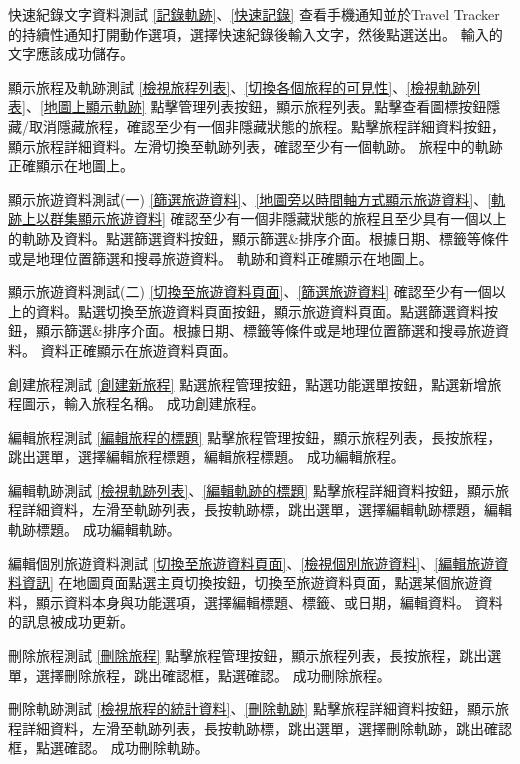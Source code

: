 \addtestcase
  {快速紀錄文字資料測試}
  {}
  {\ref{記錄軌跡}、\ref{快速記錄}}
  {查看手機通知並於Travel Tracker的持續性通知打開動作選項，選擇快速紀錄後輸入文字，然後點選送出。}
  {輸入的文字應該成功儲存。}

\addtestcase
  {顯示旅程及軌跡測試}
  {}
  {\ref{檢視旅程列表}、\ref{切換各個旅程的可見性}、\ref{檢視軌跡列表}、\ref{地圖上顯示軌跡}}
  {點擊管理列表按鈕，顯示旅程列表。點擊查看圖標按鈕隱藏/取消隱藏旅程，確認至少有一個非隱藏狀態的旅程。點擊旅程詳細資料按鈕，顯示旅程詳細資料。左滑切換至軌跡列表，確認至少有一個軌跡。}
  {旅程中的軌跡正確顯示在地圖上。}

\addtestcase
  {顯示旅遊資料測試(一)}
  {}
  {\ref{篩選旅遊資料}、\ref{地圖旁以時間軸方式顯示旅遊資料}、\ref{軌跡上以群集顯示旅遊資料}}
  {確認至少有一個非隱藏狀態的旅程且至少具有一個以上的軌跡及資料。點選篩選資料按鈕，顯示篩選\&排序介面。根據日期、標籤等條件或是地理位置篩選和搜尋旅遊資料。}
  {軌跡和資料正確顯示在地圖上。}

\addtestcase
  {顯示旅遊資料測試(二)}
  {}
  {\ref{切換至旅遊資料頁面}、\ref{篩選旅遊資料}}
  {確認至少有一個以上的資料。點選切換至旅遊資料頁面按鈕，顯示旅遊資料頁面。點選篩選資料按鈕，顯示篩選\&排序介面。根據日期、標籤等條件或是地理位置篩選和搜尋旅遊資料。}
  {資料正確顯示在旅遊資料頁面。}

\addtestcase
  {創建旅程測試}
  {}
  {\ref{創建新旅程}}
  {點選旅程管理按鈕，點選功能選單按鈕，點選新增旅程圖示，輸入旅程名稱。}
  {成功創建旅程。}

\addtestcase
  {編輯旅程測試}
  {}
  {\ref{編輯旅程的標題}}
  {點擊旅程管理按鈕，顯示旅程列表，長按旅程，跳出選單，選擇編輯旅程標題，編輯旅程標題。}
  {成功編輯旅程。}

\addtestcase
  {編輯軌跡測試}
  {}
  {\ref{檢視軌跡列表}、\ref{編輯軌跡的標題}}
  {點擊旅程詳細資料按鈕，顯示旅程詳細資料，左滑至軌跡列表，長按軌跡標，跳出選單，選擇編輯軌跡標題，編輯軌跡標題。}
  {成功編輯軌跡。}

\addtestcase
  {編輯個別旅遊資料測試}
  {}
  {\ref{切換至旅遊資料頁面}、\ref{檢視個別旅遊資料}、\ref{編輯旅遊資料資訊}}
  {在地圖頁面點選主頁切換按鈕，切換至旅遊資料頁面，點選某個旅遊資料，顯示資料本身與功能選項，選擇編輯標題、標籤、或日期，編輯資料。}
  {資料的訊息被成功更新。}

\addtestcase
  {刪除旅程測試}
  {}
  {\ref{刪除旅程}}
  {點擊旅程管理按鈕，顯示旅程列表，長按旅程，跳出選單，選擇刪除旅程，跳出確認框，點選確認。}
  {成功刪除旅程。}

\addtestcase
  {刪除軌跡測試}
  {}
  {\ref{檢視旅程的統計資料}、\ref{刪除軌跡}}
  {點擊旅程詳細資料按鈕，顯示旅程詳細資料，左滑至軌跡列表，長按軌跡標，跳出選單，選擇刪除軌跡，跳出確認框，點選確認。}
  {成功刪除軌跡。}

